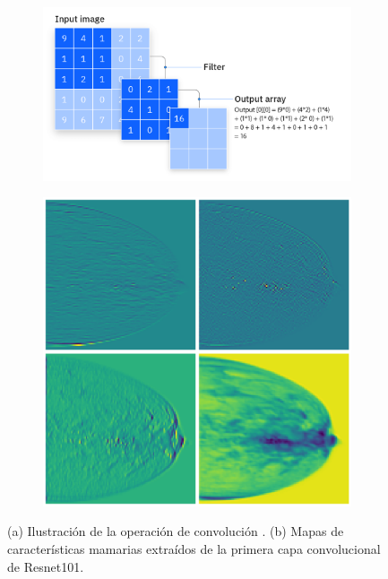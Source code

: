 \documentclass[a4paper,10pt]{book}
\begin{document}
\begin{figure}[h!]
	\centering
	\begin{subfigure}[c]{0.45\textwidth}
		\centering
		\includegraphics[width=\textwidth]{reports/assets/convolution.png}
            \caption{}
		\label{fig:convolution}
	\end{subfigure}
	\begin{subfigure}[c]{0.25\textwidth}
		\centering
		\includegraphics[width=\textwidth]{reports/assets/feature_maps_resnet.png}
            \caption{}
		\label{fig:feature_map_conv}
	\end{subfigure}
	\caption[Convolución y mapa de características]{(a) Ilustración de la operación de convolución \cite{noauthor_what_2021}. (b) Mapas de características mamarias extraídos de la primera capa convolucional de Resnet101.}
\label{fig:convolution_feature_map}
\end{figure}
\end{document}
